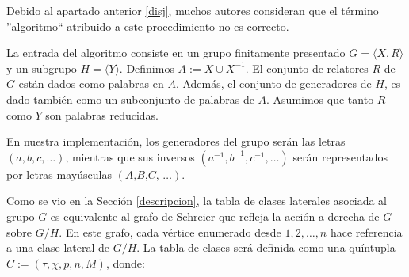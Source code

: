 \begin{remark}
    Debido al apartado anterior \eqref{disj}, muchos autores consideran que el término ''algoritmo`` atribuido a este procedimiento no es correcto.
\end{remark}




La entrada del algoritmo consiste en un grupo finitamente presentado $G=\langle X,R\rangle$ y un subgrupo $H=\langle Y \rangle$. Definimos $A:=X \cup X^{-1}$.
El conjunto de relatores $R$ de $G$ están dados como palabras en $A$. Además, el conjunto de generadores de $H$, es dado también como un subconjunto de palabras de $A$.  Asumimos que tanto $R$ como $Y$ son palabras reducidas.




\iffalse  
    \begin{Ejemplo}
    Sea $G=\langle a,b \text{ ; } ab^{-1}b^{-1}a^{-1}bbb=1 , b^{-1}a^{-1}a^{-1}baaa=1 \rangle$.
    Se establecerá una biyección de $A^*$ al conjunto de números naturales.
        \begin{align*}
            ab^{-1}b^{-1}a^{-1}bbb = aBBAbbb & \longleftrightarrow 0331222. \\
            b^{-1}a^{-1}a^{-1}baaa = BAAbaaa & \longleftrightarrow 3112000.
        \end{align*}
    \end{Ejemplo}
\fi 

En nuestra implementación, los generadores del grupo serán las letras $(a,b,c, \ldots)$, mientras que sus inversos $(a^{-1},b^{-1},c^{-1}, \ldots)$ serán representados por letras mayúsculas $(\textit{A,B,C, \ldots})$.


Como se vio en la Sección \ref{descripcion}, la tabla de clases laterales asociada al grupo $G$ es equivalente al grafo de Schreier que refleja la acción a derecha de $G$ sobre $G/H$. En este grafo, cada vértice enumerado desde $1, 2,  \ldots, n$ hace referencia a una clase lateral de $G/H$. La tabla de clases será definida como  una quíntupla $C:=(\tau, \chi, p, n, M)$, donde:



